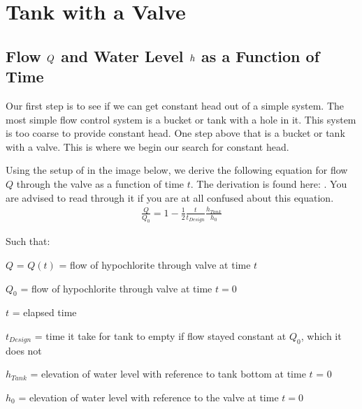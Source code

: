 \documentclass[letterpaper,10pt,english]{sphinxmanual}
\begin{document}
\section{Tank with a Valve}
\label{\detokenize{Flow_Control_and_Measurement/FCM_Design:tank-with-a-valve}}\label{\detokenize{Flow_Control_and_Measurement/FCM_Design:id1}}

\subsection{Flow \protect\(Q\protect\) and Water Level \protect\(h\protect\) as a Function of Time}
\label{\detokenize{Flow_Control_and_Measurement/FCM_Design:flow-and-water-level-as-a-function-of-time}}\label{\detokenize{Flow_Control_and_Measurement/FCM_Design:qh-as-a-function-of-t}}
Our first step is to see if we can get constant head out of a simple system. The most simple flow control system is a bucket or tank with a hole in it. This system is too coarse to provide constant head. One step above that is a bucket or tank with a valve. This is where we begin our search for constant head.

Using the setup of in the image below, we derive the following equation for flow \(Q\) through the valve as a function of time \(t\). The derivation is found here: {\hyperref[\detokenize{Flow_Control_and_Measurement/FCM_Derivations:flow-for-a-tank-with-a-valve}]{}}. You are advised to read through it if you are at all confused about this equation.
\begin{equation}\label{equation:Flow_Control_and_Measurement/FCM_Design:Q_tank_with_valve}
\begin{split}  \frac{Q}{Q_0} = 1 - \frac{1}{2} \frac{t}{t_{Design}} \frac{h_{Tank}}{h_0}\end{split}
\end{equation}
\begin{DUlineblock}{0em}
\item[] Such that:
\item[] \(Q\) = \(Q(t)\) = flow of hypochlorite through valve at time \(t\)
\item[] \(Q_0\) = flow of hypochlorite through valve at time \(t = 0\)
\item[] \(t\) = elapsed time
\item[] \(t_{Design}\) = time it  take for tank to empty if flow stayed constant at \(Q_0\), which it does not
\item[] \(h_{Tank}\) = elevation of water level with reference to tank bottom at time \(t\) = 0
\item[] \(h_0\) = elevation of water level with reference to the valve at time \(t = 0\)
\end{DUlineblock}
\end{document}
